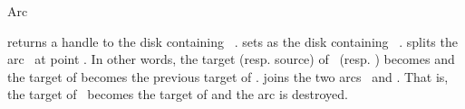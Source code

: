 \begin{ccRefConcept}{Arc}
\ccOperations

\ccTagFullDeclarations
{}
{returns a handle to the disk containing \ccVar\ .}
\ccGlue
{}
{sets  as the disk containing \ccVar\ .}
\ccGlue
{} 
{splits the arc \ccVar\ at point . In other words, the target (resp. source) 
of \ccVar\ (resp. ) becomes  and the target of  becomes
the previous target of \ccVar.}
\ccGlue
{}
{joins the two arcs \ccVar\ and . That is, the target of \ccVar\ becomes
the target of  and the arc  is destroyed.}

\ccHasModels
{}

\ccSeeAlso
{}\\

\ccTagDefaults
\end{ccRefConcept}
\ccRefPageEnd

